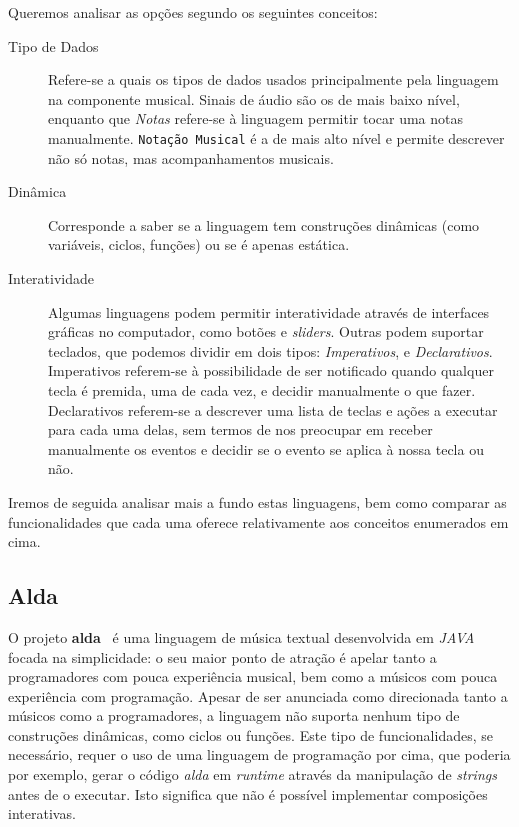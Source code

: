 Queremos analisar as opções segundo os seguintes conceitos:
\begin{description}
 \item[Tipo de Dados] Refere-se a quais os tipos de dados usados principalmente pela linguagem na componente musical. Sinais de áudio são os de mais baixo nível, enquanto que \textit{Notas} refere-se à linguagem permitir tocar uma notas manualmente. \texttt{Notação Musical} é a de mais alto nível e permite descrever não só notas, mas acompanhamentos musicais.
 \item[Dinâmica] Corresponde a saber se a linguagem tem construções dinâmicas (como variáveis, ciclos, funções) ou se é apenas estática.
 \item[Interatividade] Algumas linguagens podem permitir interatividade através de interfaces gráficas no computador, como botões e \textit{sliders}. Outras podem suportar teclados, que podemos dividir em dois tipos: \textit{Imperativos}, e \textit{Declarativos}. Imperativos referem-se à possibilidade de ser notificado quando qualquer tecla é premida, uma de cada vez, e decidir manualmente o que fazer. Declarativos referem-se a descrever uma lista de teclas e ações a executar para cada uma delas, sem termos de nos preocupar em receber manualmente os eventos e decidir se o evento se aplica à nossa tecla ou não.
\end{description}


Iremos de seguida analisar mais a fundo estas linguagens, bem como comparar as funcionalidades que cada uma oferece relativamente aos conceitos enumerados em cima.
\subsection{Alda}
O projeto \textbf{alda}~\cite{alda} é uma linguagem de música textual desenvolvida em \textit{JAVA} focada na simplicidade: o seu maior ponto de atração é apelar tanto a programadores com pouca experiência musical, bem como a músicos com pouca experiência com programação.
Apesar de ser anunciada como direcionada tanto a músicos como a programadores, a linguagem não suporta nenhum tipo de construções dinâmicas, como ciclos ou funções. Este tipo de funcionalidades, se necessário, requer o uso de uma linguagem de programação por cima, que poderia por exemplo, gerar o código \textit{alda} em \textit{runtime} através da manipulação de \textit{strings} antes de o executar. Isto significa que não é possível implementar composições interativas.

